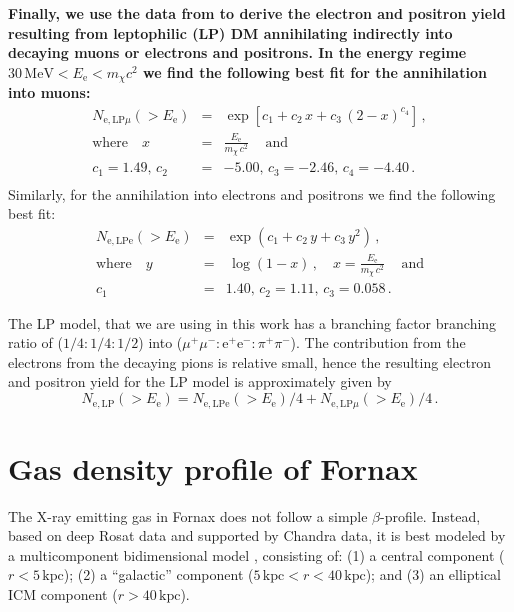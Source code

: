 \documentclass[10pt,aps,pra,reprint,amsmath,amsfonts,amssymb,showpacs,nofootinbib,floatfix]{revtex4-1}
\def\C#1{{\bf #1}}
\newcommand{\rmn}{\mathrm}
\newcommand{\ee}{E_\rmn{e}}
\newcommand{\kpc}{\rmn{kpc}}
\newcommand{\e}{\rmn{e}}
\begin{document}
\C{Finally, we use the data from
  \cite{2011JCAP...03..019C,2011JCAP...03..051C} to derive the
  electron and positron yield resulting from leptophilic (LP) DM
  annihilating indirectly into decaying muons or electrons and
  positrons. In the energy regime $30\,\rmn{MeV}<\ee< m_\chi c^2$ we
  find the following best fit for the annihilation into muons:}
\begin{eqnarray}
N_{\e,\rmn{LP}\mu}(>\ee) &=& \exp\left[c_1+c_2\,x+c_3\,(2-x)^{c_4}\right]
\,,\nonumber\\
\rmn{where}\quad x&=&\frac{\ee}{m_\chi\,c^2}\,\quad\rmn{and}\nonumber\\
c_1=1.49,\,c_2&=&-5.00,\,c_3=-2.46,\,c_4=-4.40\,.\nonumber\\
\label{eq:lp_mu}
\end{eqnarray}
Similarly, for the annihilation into electrons and positrons we find the following best fit:
\begin{eqnarray}
N_{\e,\rmn{LP}\e}(>\ee) &=& \exp\left(c_1+c_2\,y+c_3\,y^2\right)
\,,\nonumber\\
\rmn{where}\quad y&=&\,\log\left(1-x\right)\,,\quad 
x=\frac{\ee}{m_\chi\,c^2}\,\quad\rmn{and}\nonumber\\
c_1&=&1.40,\,c_2=1.11,\,c_3=0.058\,.
\label{eq:lp_ep}
\end{eqnarray}

The LP model, that we are using in this work has a branching factor
branching ratio of ($1/4:1/4:1/2$) into
($\mu^+\mu^-:\e^+\e^-:\pi^+\pi^-$). The contribution from the
electrons from the decaying pions is relative small, hence the
resulting electron and positron yield for the LP model is
approximately given by
\begin{equation}
N_{\e,\rmn{LP}}(>\ee) =
N_{\e,\rmn{LP}\e}(>\ee)/4+N_{\e,\rmn{LP}\mu}(>\ee)/4\,.
\end{equation}

\section{Gas density profile of Fornax}
The X-ray emitting gas in Fornax does not follow a simple
$\beta$-profile. Instead, based on deep Rosat data and supported by
Chandra data, it is best modeled by a multicomponent bidimensional
model \cite{2002ApJ...565..883P}, consisting of: (1) a central
component ($r<5\,\kpc$); (2) a ``galactic'' component
($5\,\kpc<r<40\,\kpc$); and (3) an elliptical ICM component
($r>40\,\kpc$). 
\end{document}
